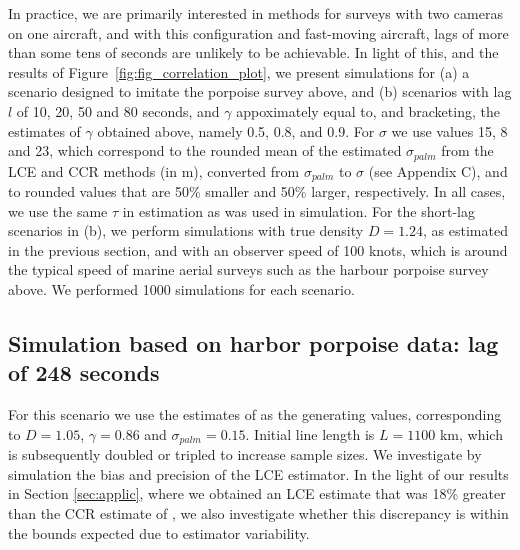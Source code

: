 \documentclass[useAMS, usenatbib, referee]{biom}\usepackage[]{graphicx}\usepackage[]{color}
\begin{document}
In practice, we are primarily interested in methods for surveys with two cameras on one aircraft, and with this configuration and fast-moving aircraft, lags of more than some tens of seconds are unlikely to be achievable. In light of this, and the results of Figure~\ref{fig:fig_correlation_plot}, we present simulations for (a) a scenario designed to imitate the porpoise survey above, and (b) scenarios with lag $l$ of 10, 20, 50 and 80 seconds, and $\gamma$ appoximately equal to, and bracketing, the estimates of $\gamma$ obtained above, namely 0.5, 0.8, and 0.9. For $\sigma$ we use values 15, 8 and 23, which correspond to the rounded mean of the estimated $\sigma_{palm}$ from the LCE and CCR methods (in m), converted from $\sigma_{palm}$ to $\sigma$ (see Appendix C), and to rounded values that are 50\% smaller and 50\% larger, respectively. In all cases, we use the same $\tau$ in estimation as was used in simulation. For the short-lag scenarios in (b), we perform simulations with true density $D=1.24$, as estimated in the previous section, and with an observer speed of 100 knots, which is around the typical speed of marine aerial surveys such as the harbour porpoise survey above. We performed 1000 simulations for each scenario.


\subsection{Simulation based on harbor porpoise data: lag of 248 seconds}


For this scenario we use the estimates of \cite{Stevenson+al:19} as the generating values, corresponding to $D=1.05$, $\gamma=0.86$ and $\sigma_{palm}=0.15$. Initial line length is $L=1100$ km, which is subsequently doubled or tripled to increase sample sizes. We investigate by simulation the bias and precision of the LCE estimator. In the light of our results in Section \ref{sec:applic}, where we obtained an LCE estimate that was 18\% greater than the CCR estimate of \cite{Stevenson+al:19}, we also investigate whether this discrepancy is within the bounds expected due to estimator variability.

\end{document}
